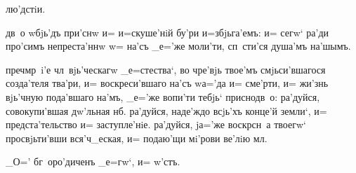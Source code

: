 лю'дстiи.

дв~о w\т бjь'дъ при'снw и= и=скуше'нiй бу'ри 
и=збjьга'емъ: и= сегw` ра'ди про'симъ непреста'ннw w= 
на'съ _е='же моли'ти, сп~сти'ся душа'мъ на'шымъ.


преч мр~i'е чл~вjь'ческагw _е=стества`, во чре'вjь 
твое'мъ смjьси'вшагося созда'теля тва'ри, и= 
воскреси'вшаго на'съ w\т а='да и= сме'рти, и= жи'знь 
вjь'чную пода'вшаго на'мъ, _е='же вопи'ти тебjь` 
приснодв~о: ра'дуйся, совокупи'вшая дw'льная нб. 
ра'дуйся, наде'ждо всjь'хъ конце'й земли`, и= 
предста'тельство и= заступле'нiе. ра'дуйся, jа='же 
воскр сн~а твоегw` просвjьти'вши вся'ч_еская, и= 
подаю'щи мi'рови ве'лiю мл.

_О='%
бг~оро'диченъ _е=гw`, и= w'стъ. %
